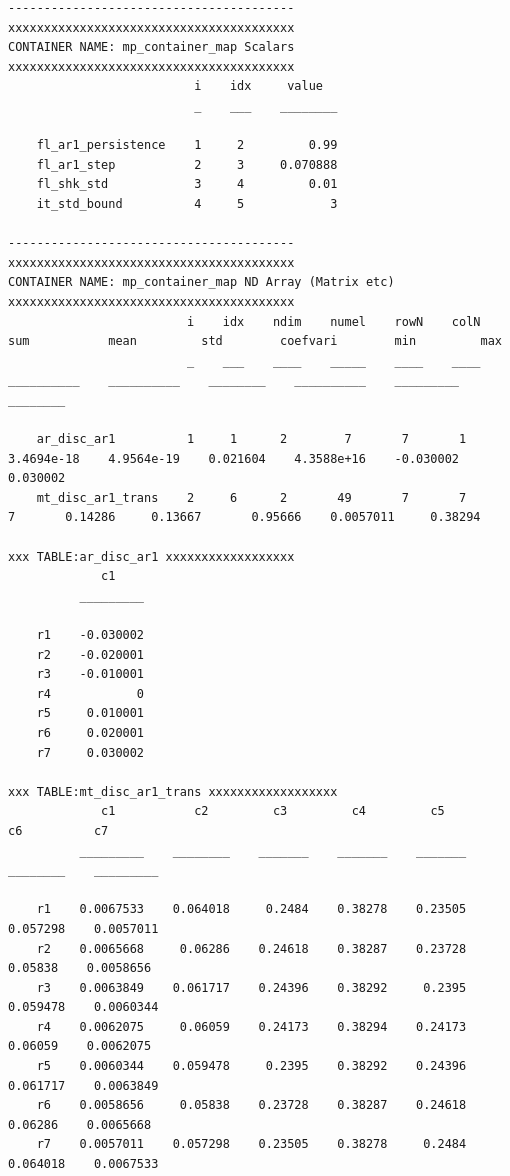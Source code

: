 \documentclass[
]{book}
\begin{document}
\begin{verbatim}
----------------------------------------
xxxxxxxxxxxxxxxxxxxxxxxxxxxxxxxxxxxxxxxx
CONTAINER NAME: mp_container_map Scalars
xxxxxxxxxxxxxxxxxxxxxxxxxxxxxxxxxxxxxxxx
                          i    idx     value  
                          _    ___    ________

    fl_ar1_persistence    1     2         0.99
    fl_ar1_step           2     3     0.070888
    fl_shk_std            3     4         0.01
    it_std_bound          4     5            3

----------------------------------------
xxxxxxxxxxxxxxxxxxxxxxxxxxxxxxxxxxxxxxxx
CONTAINER NAME: mp_container_map ND Array (Matrix etc)
xxxxxxxxxxxxxxxxxxxxxxxxxxxxxxxxxxxxxxxx
                         i    idx    ndim    numel    rowN    colN       sum           mean         std        coefvari        min         max   
                         _    ___    ____    _____    ____    ____    __________    __________    ________    __________    _________    ________

    ar_disc_ar1          1     1      2        7       7       1      3.4694e-18    4.9564e-19    0.021604    4.3588e+16    -0.030002    0.030002
    mt_disc_ar1_trans    2     6      2       49       7       7               7       0.14286     0.13667       0.95666    0.0057011     0.38294

xxx TABLE:ar_disc_ar1 xxxxxxxxxxxxxxxxxx
             c1    
          _________

    r1    -0.030002
    r2    -0.020001
    r3    -0.010001
    r4            0
    r5     0.010001
    r6     0.020001
    r7     0.030002

xxx TABLE:mt_disc_ar1_trans xxxxxxxxxxxxxxxxxx
             c1           c2         c3         c4         c5          c6          c7    
          _________    ________    _______    _______    _______    ________    _________

    r1    0.0067533    0.064018     0.2484    0.38278    0.23505    0.057298    0.0057011
    r2    0.0065668     0.06286    0.24618    0.38287    0.23728     0.05838    0.0058656
    r3    0.0063849    0.061717    0.24396    0.38292     0.2395    0.059478    0.0060344
    r4    0.0062075     0.06059    0.24173    0.38294    0.24173     0.06059    0.0062075
    r5    0.0060344    0.059478     0.2395    0.38292    0.24396    0.061717    0.0063849
    r6    0.0058656     0.05838    0.23728    0.38287    0.24618     0.06286    0.0065668
    r7    0.0057011    0.057298    0.23505    0.38278     0.2484    0.064018    0.0067533


\end{verbatim}
\end{document}
